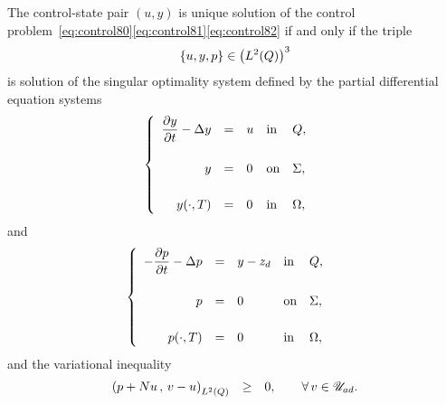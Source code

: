 \begin{theoreme}\label{thm:sosingulier}%
    The control-state pair $(u,y)$ is unique solution of the control
    problem~\eqref{eq:control80}\eqref{eq:control81}\eqref{eq:control82} if
    and only if the triple
    \begin{equation*}
        \left\{{%
            u,y,p
        }\right\}\in {\left({\Ldeux{Q}}\right)}^{3}
    \end{equation*}
    is solution of the singular optimality system defined by the partial
    differential equation systems
    \begin{equation}
        \begin{cases}\displaystyle
            \begin{array}{rclll}
                \dfrac{\partial{}y}{\partial{}t} - \Delta y & = & u & \text{in} & Q,\\
                \\
                y & = & 0 & \text{on} & \Sigma,\\
                \\
                {y}\!\left({\cdot,T}\right) & = & 0 & \text{in} & \Omega,
            \end{array}
        \end{cases}
    \end{equation}
    and
    \begin{equation}
        \begin{cases}\displaystyle
            \begin{array}{rclll}
                -\dfrac{\partial{}p}{\partial{}t} - \Delta p & = & y - z_{d} & \text{in} &
                Q,\\
                \\
                p & = & 0 & \text{on} & \Sigma,\\
                \\
                {p}\!\left({\cdot,T}\right) & = & 0 & \text{in} & \Omega,
            \end{array}
        \end{cases}
    \end{equation}
    and the variational inequality
    \begin{equation}
        \begin{array}{rcll}
            \scalaireq{%
                p + Nu
            }{%
                v - u
            } & \geq & 0,\qquad\forall\,v\in\uad.
        \end{array}
    \end{equation}
\end{theoreme}
